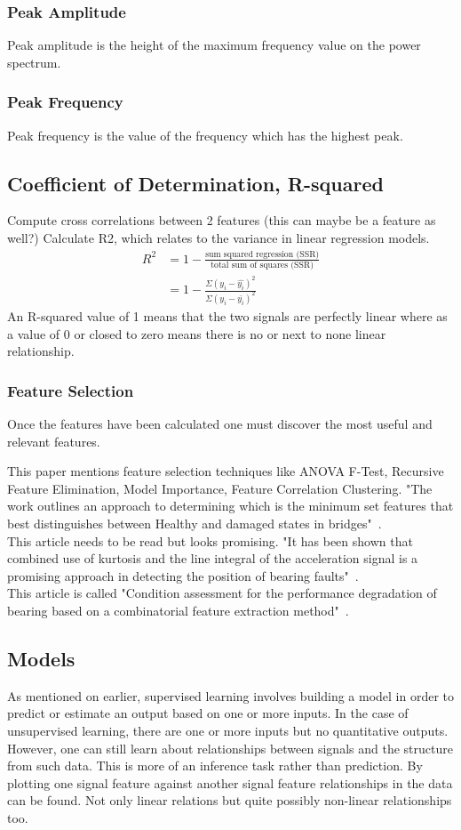 \documentclass{article}
\begin{document}
\subsubsection{Peak Amplitude}
Peak amplitude is the height of the maximum frequency value on the power spectrum.
\subsubsection{Peak Frequency}
Peak frequency is the value of the frequency which has the highest peak.

\subsection{Coefficient of Determination, R-squared}
Compute cross correlations between 2 features (this can maybe be a feature as well?)
Calculate R2, which relates to the variance in linear regression models.
\begin{align*}
 R^2 &= 1 - \frac{\textrm{sum squared regression (SSR)}}{\textrm{total sum of squares (SSR)}} \\ 
 &= 1 - \frac{\Sigma(y_i - \hat{y_i})^2}{\Sigma(y_i - \bar{y_i})^2} 
\end{align*}
An R-squared value of 1 means that the two signals are perfectly linear where as a value of 0 or closed to zero means there is no or next to none linear relationship.
\subsubsection{Feature Selection}
Once the features have been calculated one must discover the most useful and relevant features. 

This paper mentions feature selection techniques like ANOVA F-Test, Recursive Feature Elimination, Model Importance, Feature Correlation Clustering. "The work outlines an approach to determining which is the minimum set features that best distinguishes between Healthy and damaged states in bridges"~\cite{buckley2023feature}.\\
This article needs to be read but looks promising. "It has been shown that combined use of kurtosis and the line integral of the acceleration signal is a promising approach in detecting the position of bearing faults"~\cite{kateris2014machine}.\\
This article is called "Condition assessment for the performance degradation of bearing based on a combinatorial feature extraction method"~\cite{hong2014condition}.
\subsection{Models}
As mentioned on earlier, supervised learning involves building a model in order to predict or estimate an output based on one or more inputs. In the case of unsupervised learning, there are one or more inputs but no quantitative outputs. However, one can still learn about relationships between signals and the structure from such data. This is more of an inference task rather than prediction.
By plotting one signal feature against another signal feature relationships in the data can be found. Not only linear relations but quite possibly non-linear relationships too.
\end{document}
